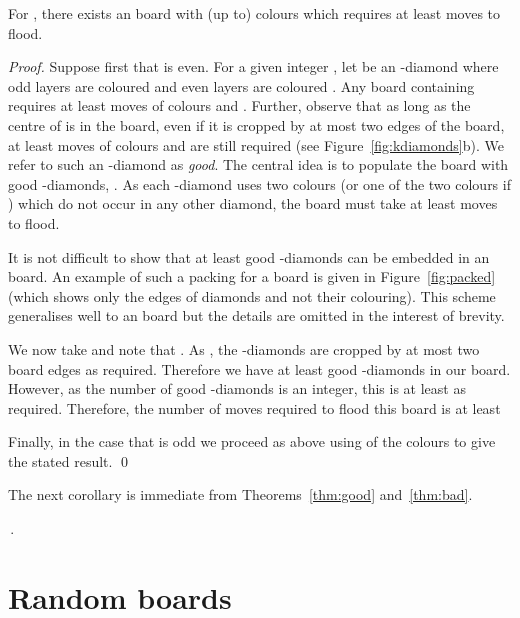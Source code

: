 \documentclass[a4paper,11pt]{llncs}
\newcounter{l}
\newcommand{\recdim}[2]{}
\begin{document}
\begin{theorem} \label{thm:bad}
    For , there exists an \recdim{n}{n} board with (up to)  colours which requires at least  moves to flood.
\end{theorem}
\begin{proof}


    Suppose first that  is even. For a given integer , let  be an -diamond where odd layers are coloured  and even layers are coloured . Any board containing  requires at least  moves of colours  and . Further, observe that as long as the centre of  is in the board, even if it is cropped by at most two edges of the board, at least  moves of colours  and  are still required (see Figure~\ref{fig:kdiamonds}b). We refer to such an -diamond as \emph{good}. The central idea is to populate the board with good -diamonds, . As each -diamond uses two colours (or one of the two colours if ) which do not occur in any other diamond, the board must take at least  moves to flood.

    It is not difficult to show that at least  good -diamonds can be embedded in an \recdim{n}{n} board. An example of such a packing for a \recdim{20}{20} board is given in Figure~\ref{fig:packed} (which shows only the edges of diamonds and not their colouring). This scheme generalises well to an \recdim{n}{n} board but the details are omitted in the interest of brevity.
    



    We now take  and note that . As , the -diamonds are cropped by at most two board edges as required. Therefore we have at least  good -diamonds in our board. However, as the number of good -diamonds is an integer, this is at least  as required. Therefore, the number of moves required to flood this board is at least 

    Finally, in the case that  is odd we proceed as above using  of the colours to give the stated result. \qed
\end{proof}

The next corollary is immediate from Theorems~\ref{thm:good} and~\ref{thm:bad}.

\begin{corollary}
    \label{col:moves}
    \,.
\end{corollary}


\section{Random boards} \label{sec:random}
\end{document}
